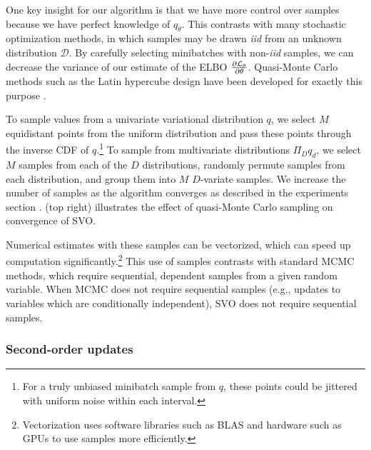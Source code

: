 One key insight for our algorithm is that we have more control over
samples because we have perfect knowledge of $q_\theta$.  This
contrasts with many stochastic optimization methods, in which samples
may be drawn \emph{iid} from an unknown distribution $\mathcal{D}$.
By carefully selecting minibatches with non-\emph{iid} samples, we can
decrease the variance of our estimate of the ELBO $\frac{\partial  \mathcal{L}_\theta
}{\partial \theta}$.  Quasi-Monte Carlo methods such as the Latin hypercube
design have been developed for exactly this purpose
\citep{tang:1993,owen:1998,niederreiter:1992}.

To sample values from a univariate variational distribution $q$, we
select $M$ equidistant points from the uniform distribution and pass
these points through the inverse CDF of $q$.\footnote{For a truly
  unbiased minibatch sample from $q$, these points could be jittered
  with uniform noise within each interval.} To sample from
multivariate distributions $\Pi_D q_d$, we select $M$ samples from
each of the $D$ distributions, randomly permute samples from each
distribution, and group them into $M$ $D$-variate samples. We increase
the number of samples as the algorithm converges as described in the
experiments section
\citep{wei:1990}.  (top
right) illustrates the effect of quasi-Monte Carlo sampling on
convergence of SVO.

Numerical estimates with these samples can be vectorized, which can
speed up computation significantly.\footnote{Vectorization uses
  software libraries such as BLAS and hardware such as GPUs to use
  samples more efficiently.}  This use of samples contrasts with
standard MCMC methods, which require sequential, dependent samples
from a given random variable.  When MCMC does not require sequential
samples (e.g., updates to variables which are conditionally
independent), SVO does not require sequential samples.

 \subsubsection{Second-order updates}
 \label{sec:second_order_updates}

